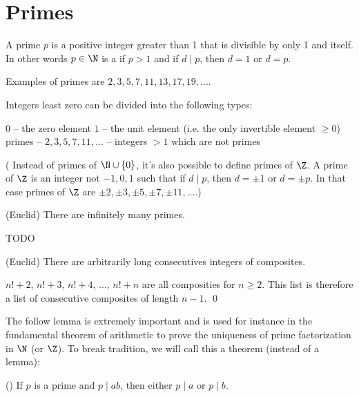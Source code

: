 \section{Primes}

\begin{defn}
A prime $p$ is a positive integer greater than 1 that is
divisible by only 1 and itself.
In other words $p \in \N$ is a
if $p > 1$ and 
if $d \mid p$, then $d = 1$ or $d = p$.
\end{defn}

Examples of primes are $2, 3, 5, 7, 11, 13, 17, 19, ...$.

Integers least zero can be divided into the following types:
\begin{enumerate}[nosep]
  \li $0$ -- the zero element
  \li $1$ -- the unit element (i.e. the only invertible element $\geq 0$)
  \li primes -- $2, 3, 5, 7, 11, ...$
  \li {} -- integers $> 1$ which are not primes 
\end{enumerate}

(
Instead of primes of $\N \cup \{0\}$,
it's also possible to define primes of $\Z$.
A prime of $\Z$ is an integer not $-1, 0, 1$
such that if $d \mid p$, then $d = \pm 1$ or $d = \pm p$.
In that case primes of $\Z$ are
$\pm 2, \pm 3, \pm 5, \pm 7, \pm 11, ...$.)


\begin{prop} \textnormal{(Euclid)}
  There are infinitely many primes.
\end{prop}

\proof
TODO


\begin{prop} \textnormal{(Euclid)}
  There are arbitrarily long consecutives integers of composites.
\end{prop}

\proof
$n!+2$,
$n!+3$,
$n!+4$,
$\ldots$,
$n!+n$
are all composities for $n \geq 2$.
This list is therefore a list of consecutive composites of length
$n - 1$.
\qed


The follow lemma is extremely important and is used
for instance in the fundamental theorem of arithmetic to prove
the uniqueness of prime factorization in $\N$ (or $\Z$).
To break tradition, we will call this a theorem (instead of a lemma):

\begin{thm}
  \textnormal{()}
  If $p$ is a prime and $p \mid ab$, then either $p \mid a$ or $p \mid b$.
\end{thm}

